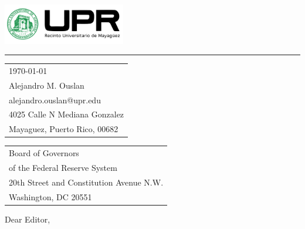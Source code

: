 \documentclass{article}
\begin{document}

\includegraphics[width=0.4\textwidth]{logo.png} %

\vspace{-1em} %

\rule{\linewidth}{1pt} %

\bigskip\bigskip %


\hfill
\begin{tabular}{l @{}}
\hfill \today \bigskip\\ %
\hfill Alejandro M. Ouslan \\
\hfill alejandro.ouslan@upr.edu \\
\hfill 4025 Calle N Mediana Gonzalez\\
\hfill Mayaguez, Puerto Rico, 00682 \\ %
\end{tabular}

\bigskip %


\begin{tabular}{@{} l}
Board of Governors \\
of the Federal Reserve System \\
20th Street and Constitution Avenue N.W. \\
Washington, DC 20551
\end{tabular}


\bigskip %

Dear Editor,

\bigskip %

\end{document}
